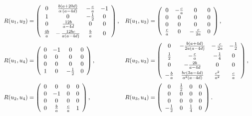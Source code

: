 \documentclass{amsart}
\theoremstyle{plain}
\theoremstyle{remark}
\begin{document}
{{\begin{equation}\label{RA1}
\begin{array}{ll}
R(u_1,u_2) =\left( \begin {array}{cccc} 0& \frac {b (a+20 d)}{\alpha\, \left(a -4d \right)}&-{\frac {c}{a}}&-1\\1&0&-\frac 12 &0\\0&\,{\frac {12b}{a-4d}}&0&0\\ \noalign{\smallskip}{\frac {4b}{a}}&-\,{\frac {12bc}{a \left(a -4d \right) }}&{\frac {b}{a}}&0\end {array} \right), &R(u_1,u_3)=\left( \begin {array}{cccc} 0&-{\frac {c}{a}}&0&0\\0&0&0&0\\0&0&0&0\\{\frac {c}{a}}&0&-\,{\frac {c}{2a}}&0\end {array} \right), 
\vspace{2mm} \\ 
R(u_1,u_4) =\left( \begin {array}{cccc} 0& -1& 0 &0 \\0&0&0&0\\ 0& 0 &0&0\\ 1 &0 & -\frac 12 &0\end {array} \right), &R(u_2,u_3)=\left( \begin {array}{cccc} 0&-\frac {
b(a +4 d)}{2a  \left(a -4d \right) }&-\,{\frac {c}{2a}}&-\frac 12\\ \noalign{\smallskip}\frac 12 &-{\frac {c}{a}}&-\frac 14&0\\\noalign{\smallskip}0&-{\frac {2b}{a -4d}}&0&0\\\noalign{\smallskip}-{\frac {b}{a}}&\frac {bc (3a-4d)}{a^{2} (a -4d) }  &{\frac {c^{2}}{a^{2}}}&{\frac {c}{a}}\end {array} \right), 
\vspace{2mm}\\ 
R(u_2,u_4)=\left( \begin {array}{cccc} 0&0&0&0\\ 0&-1&0&0\\ 0&0&0&0\\ 0&{\frac {b}{a}}&{\frac {c}{a}}&1\end {array} \right), &R(u_3,u_4)=\left( \begin {array}{cccc} 0&\frac 12 &0&0\\ 0&0&0&0\\ 0&0&0&0\\ -\frac 12& 0 & {\frac {1}{4}}&0\end {array} \right)  .
\end{array}
\end{equation}
}

}
\end{document}
